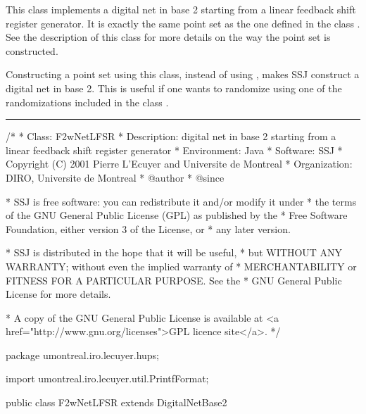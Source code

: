 
This class implements a digital net in base 2 starting from a
linear feedback shift register generator.  It is exactly the same
point set as the one defined in the class 
. 
 See the description
of this class for more details on the way the point set is constructed.

Constructing a point set using this class, instead of using
 ,
makes SSJ construct a digital net in base 2.  This is useful if one
wants to randomize using one of the randomizations included in the class
.

\bigskip\hrule\bigskip

\begin{code}
\begin{hide}
/*
 * Class:        F2wNetLFSR
 * Description:  digital net in base 2 starting from a linear feedback
                 shift register generator
 * Environment:  Java
 * Software:     SSJ 
 * Copyright (C) 2001  Pierre L'Ecuyer and Universite de Montreal
 * Organization: DIRO, Universite de Montreal
 * @author       
 * @since

 * SSJ is free software: you can redistribute it and/or modify it under
 * the terms of the GNU General Public License (GPL) as published by the
 * Free Software Foundation, either version 3 of the License, or
 * any later version.

 * SSJ is distributed in the hope that it will be useful,
 * but WITHOUT ANY WARRANTY; without even the implied warranty of
 * MERCHANTABILITY or FITNESS FOR A PARTICULAR PURPOSE.  See the
 * GNU General Public License for more details.

 * A copy of the GNU General Public License is available at
   <a href="http://www.gnu.org/licenses">GPL licence site</a>.
 */
\end{hide}
package umontreal.iro.lecuyer.hups; \begin{hide} 

import umontreal.iro.lecuyer.util.PrintfFormat;
\end{hide}

public class F2wNetLFSR extends DigitalNetBase2 \begin{hide} 
{
   private F2wStructure param;

    /**
     * Constructs and stores the set of cycles for an LCG with
     *    modulus <SPAN CLASS="MATH"><I>n</I></SPAN> and multiplier <SPAN CLASS="MATH"><I>a</I></SPAN>.
     *   If pgcd<SPAN CLASS="MATH">(<I>a</I>, <I>n</I>) = 1</SPAN>, this constructs a full-period LCG which has two
     *   cycles, one containing 0 and one, the LCG period.
     *
     * @param n required number of points and modulo of the LCG
     *
     *    @param a generator <SPAN CLASS="MATH"><I>a</I></SPAN> of the LCG
     *
     *
     */
\end{hide}
\end{code}

